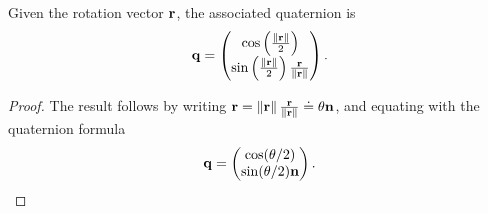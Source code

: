 \begin{lemma} \label{eq:rotvec_to_quat}
Given the rotation vector $\mathbf{r}$, the associated quaternion is
\[
\mathbf{q} = \begin{pmatrix} \cos\left(\frac{\left\|\mathbf{r}\right\|}{2}\right) \\ \sin\left(\frac{\left\|\mathbf{r}\right\|}{2}\right) \frac{\mathbf{r}}{\left\|\mathbf{r}\right\|} \end{pmatrix}.
\]
\end{lemma}
\begin{proof}
The result follows by writing $\mathbf{r} = \left\|\mathbf{r}\right\|\frac{\mathbf{r}}{\left\|\mathbf{r}\right\|} \doteq \theta \mathbf{n}$, and equating with the quaternion formula
\[
\mathbf{q} = \begin{pmatrix} \cos(\theta/2) \\ \sin(\theta/2)\mathbf{n} \end{pmatrix}.
\]
\end{proof}

